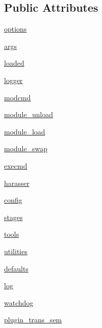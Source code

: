 \subsection*{Public Attributes}
\begin{DoxyCompactItemize}
\item 
\hyperlink{class_test_def_1_1_test_def_a7c7d587995154a9f31607dc4726d3a2a}{options}
\item 
\hyperlink{class_test_def_1_1_test_def_a30e459036991de30822f267f1d882d44}{args}
\item 
\hyperlink{class_test_def_1_1_test_def_a21764cc1b70626946a708b7a0f003b38}{loaded}
\item 
\hyperlink{class_test_def_1_1_test_def_a2ec3a5ec20bb6ba539d68c3c5a40ca5d}{logger}
\item 
\hyperlink{class_test_def_1_1_test_def_af6c1e9ceaf9d8e747bbb57af3bd33198}{modcmd}
\item 
\hyperlink{class_test_def_1_1_test_def_aba7b969431e50773d10f1384ae2149ab}{module\-\_\-unload}
\item 
\hyperlink{class_test_def_1_1_test_def_a6a81a148c0d20e6cdc14ee966b6dc8f2}{module\-\_\-load}
\item 
\hyperlink{class_test_def_1_1_test_def_a7573371e9c4ccc1713439a63a5ccc64f}{module\-\_\-swap}
\item 
\hyperlink{class_test_def_1_1_test_def_aa3ffe5befea4becaad6a8c5f13446039}{execmd}
\item 
\hyperlink{class_test_def_1_1_test_def_a1dc633e4dd69542c5eb07e880d7ea401}{harasser}
\item 
\hyperlink{class_test_def_1_1_test_def_a85a2e1fffeda060f750494dd4082594d}{config}
\item 
\hyperlink{class_test_def_1_1_test_def_a9e15c13bd0cc9b1567c94f847118432e}{stages}
\item 
\hyperlink{class_test_def_1_1_test_def_a2414cc1583555b0c758e0f9f0952a787}{tools}
\item 
\hyperlink{class_test_def_1_1_test_def_a0b9ea6f06c02401ad62e06c4cfd80bd2}{utilities}
\item 
\hyperlink{class_test_def_1_1_test_def_a96d72418702f22844fc2fd5d774c7291}{defaults}
\item 
\hyperlink{class_test_def_1_1_test_def_a50bbc74a64733e7dbec613bbfe3a519d}{log}
\item 
\hyperlink{class_test_def_1_1_test_def_a40da46aa95507cffa798cb152fa69e27}{watchdog}
\item 
\hyperlink{class_test_def_1_1_test_def_ac4a745e8b2151d1eed56e04770562eb9}{plugin\-\_\-trans\-\_\-sem}

\end{DoxyCompactItemize}
